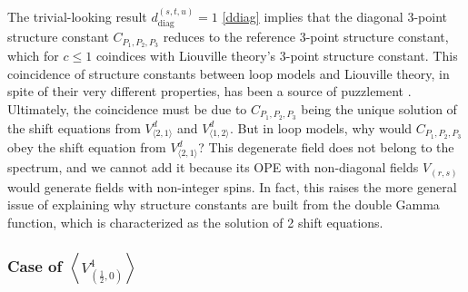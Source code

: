\documentclass[12pt, a4paper]{article}
\begin{document}
The trivial-looking result $d_\text{diag}^{(s,t,u)} = 1$ \eqref{ddiag} implies that the diagonal 3-point structure constant $C_{P_1,P_2,P_3}$ reduces to the reference 3-point structure constant, which for $c\leq 1$ coindices with Liouville theory's 3-point structure constant. This coincidence of structure constants between loop models and Liouville theory, in spite of their very different properties, has been a source of puzzlement \cite{ijs15, rib22}. Ultimately, the coincidence must be due to $C_{P_1,P_2,P_3}$ being the unique solution of 
the shift equations from $V^d_{\langle 2,1\rangle}$ and $V^d_{\langle 1,2\rangle}$. But in loop models, why would $C_{P_1,P_2,P_3}$ obey the shift equation from $V^d_{\langle 2,1\rangle}$? This degenerate field does not belong to the spectrum, and we cannot add it because its OPE with non-diagonal fields $V_{(r,s)}$ would generate fields with non-integer spins. In fact, this raises the more general issue of explaining why structure constants are built from the double Gamma function, which is characterized as the solution of 2 shift equations.

\subsubsection[Case of $\left<V_{(\frac12, 0)}^4\right>$]{Case of $\left<V_{(\frac12, 0)}^4\right>$ \pice}
\end{document}
